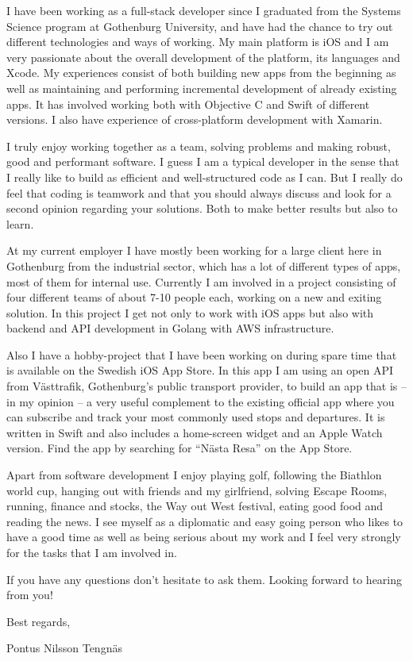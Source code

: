

I have been working as a full-stack developer since I graduated from the Systems Science program at
Gothenburg University, and have had the chance to try out different technologies and ways 
of working. My main platform is iOS and I am very passionate about the overall development 
of the platform, its languages and Xcode. My experiences consist of both building new apps 
from the beginning as well as maintaining and performing incremental development of already
existing apps. It has involved working both with Objective C and Swift of different versions. 
I also have experience of cross-platform development with Xamarin.

I truly enjoy working together as a team, solving problems and making robust, good and
performant software. I guess I am a typical developer in the sense that I really like 
to build as efficient and well-structured code as I can. But I really do feel that coding 
is teamwork and that you should always discuss and look for a second opinion regarding your solutions. 
Both to make better results but also to learn.

At my current employer I have mostly been working for a large client here in Gothenburg from 
the industrial sector, which has a lot of different types of apps, most of them for internal use. 
Currently I am involved in a project consisting of four different teams of about 7-10 people each, 
working on a new and exiting solution. In this project I get not only to work with iOS apps 
but also with backend and API development in Golang with AWS infrastructure.

Also I have a hobby-project that I have been working on during spare time that is available 
on the Swedish iOS App Store. In this app I am using an open API from Västtrafik, Gothenburg’s public 
transport provider, to build an app that is – in my opinion – a very useful complement to the 
existing official app where you can subscribe and track your most commonly used stops and departures. 
It is written in Swift and also includes a home-screen widget and an Apple Watch version. Find 
the app by searching for “Nästa Resa” on the App Store.

Apart from software development I enjoy playing golf, following the Biathlon world cup, 
hanging out with friends and my girlfriend, solving Escape Rooms, running, finance and stocks, 
the Way out West festival, eating good food and reading the news. I see myself as a diplomatic 
and easy going person who likes to have a good time as well as being serious about my work and 
I feel very strongly for the tasks that I am involved in.

If you have any questions don’t hesitate to ask them. Looking forward to hearing from you!

Best regards,

Pontus Nilsson Tengnäs
